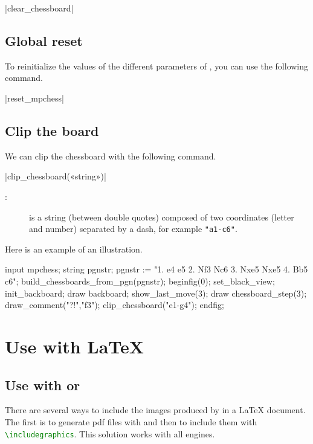 \documentclass[english]{ltxdoc}
\begin{document}
\commande|clear_chessboard|\smallskip


\subsection{Global reset}

To reinitialize the values of the different parameters of \mpchess, you can use
the following command.

\commande|reset_mpchess|\smallskip


\subsection{Clip the board}

We can clip the chessboard with the following command.

\commande|clip_chessboard(«string»)|\smallskip


\begin{description}
\item[:] is a string (between double quotes)
composed of two coordinates (letter and number) separated by a dash, for example \lstinline+"a1-c6"+.
\end{description}

Here is an example of an illustration.
\begin{ExempleMP}
input mpchess;
string pgnstr;
pgnstr := "1. e4 e5 2. Nf3 Nc6 3. Nxe5 Nxe5 4. Bb5 c6";
build_chessboards_from_pgn(pgnstr);
beginfig(0);
set_black_view;
init_backboard;
draw backboard;
show_last_move(3);
draw chessboard_step(3); %
draw_comment("?!","f3");
clip_chessboard("e1-g4");
endfig;
\end{ExempleMP}


\section{Use with \LaTeX{}}

\subsection{Use with  or }

There are several ways to include the images produced by \mpchess in a \LaTeX
document. The first is to generate pdf files with \MP{} and then to include them
with \lstinline[language=TeX]+\includegraphics+. This solution works with all
engines.
\end{document}
